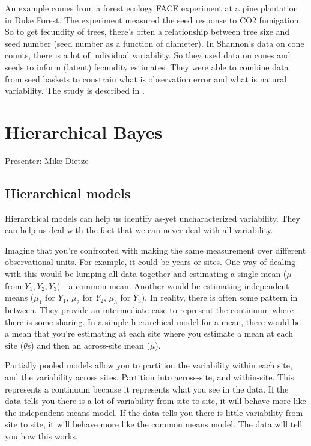 \documentclass[12pt, oneside]{article}   	%
\begin{document}
An example comes from a forest ecology FACE experiment at a pine plantation in Duke Forest. The experiment measured the seed response to CO2 fumigation. So to get fecundity of trees, there's often a relationship between tree size and seed number (seed number as a function of diameter). In Shannon's data on cone counts, there is a lot of individual variability. So they used data on cones and seeds to inform (latent) fecundity estimates. They were able to combine data from seed baskets to constrain what is observation error and what is natural variability. The study is described in \cite{ladeau2006}.

\section{Hierarchical Bayes}

\noindent Presenter: Mike Dietze

\subsection{Hierarchical models}

Hierarchical models can help us identify as-yet uncharacterized variability. They can help us deal with the fact that we can never deal with all variability.

Imagine that you're confronted with making the same measurement over different observational units. For example, it could be years or sites. One way of dealing with this would be lumping all data together and estimating a single mean ($\mu$ from $Y_1, Y_2, Y_3$) - a common mean. Another would be estimating independent means ($\mu_1$ for $Y_1$, $\mu_2$ for $Y_2$, $\mu_3$ for $Y_3$). In reality, there is often some pattern in between. They provide an intermediate case to represent the continuum where there is some sharing. In a simple hierarchical model for a mean, there would be a mean that you're estimating at each site where you estimate a mean at each site ($\theta$s) and then an across-site mean ($\mu$). 

Partially pooled models allow you to partition the variability within each site, and the variability across sites. Partition into across-site, and within-site. This represents a continuum because it represents what you see in the data. If the data tells you there is a lot of variability from site to site, it will behave more like the independent means model.  If the data tells you there is little variability from site to site, it will behave more like the common means model. The data will tell you how this works.
\end{document}

